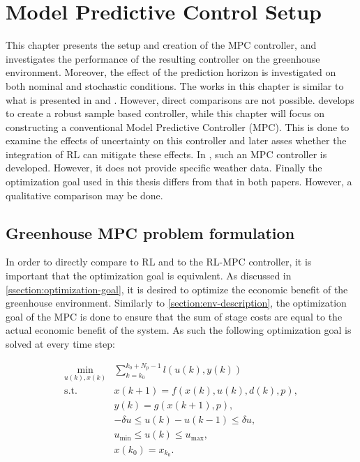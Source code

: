 \chapter{Model Predictive Control Setup}
\label{chapter:MPC}
This chapter presents the setup and creation of the MPC controller, and investigates the performance of the resulting controller on the greenhouse environment. Moreover, the effect of the prediction horizon is investigated on both nominal and stochastic conditions. The works in this chapter is similar to what is presented in \cite{boersmaRobustSamplebasedModel2022} and \cite{morcegoReinforcementLearningModel2023}. However, direct comparisons are not possible. \cite{boersmaRobustSamplebasedModel2022} develops to create a robust sample based controller, while this chapter will focus on constructing a conventional Model Predictive Controller (MPC). This is done to examine the effects of uncertainty on this controller and later asses whether the integration of RL can mitigate these effects. In \cite{morcegoReinforcementLearningModel2023}, such an MPC controller is developed. However, it does not provide specific weather data. Finally the optimization goal used in this thesis differs from that in both papers. However, a qualitative comparison may be done.




\section{Greenhouse MPC problem formulation}\label{section: greenhouse MPC formulation}
In order to directly compare to RL and to the RL-MPC controller, it is important that the optimization goal is equivalent. As discussed in \autoref{ssection:optimization-goal}, it is desired to optimize the economic benefit of the greenhouse environment. Similarly to \autoref{section:env-description}, the optimization goal of the MPC is done to ensure that the sum of stage costs are equal to the actual economic benefit of the system. As such the following optimization goal is solved at every time step:

\begin{subequations} \label{eq:mpc_ocp}
	\begin{align}
		\min_{u(k),x(k)} & \sum_{k = k_0}^{k_0 + N_p-1} {l(u(k), y(k))} \\
		\text{s.t.} \quad & x(k+1) = f(x(k), u(k), d(k), p),  \label{eq:constraint-1} \\
		& y(k) = g(x(k+1), p), \label{eq:constraint-dynamics} \\
		& -\delta u \leq u(k) - u(k-1) \leq \delta u, \label{eq:constraint-delta-u} \\
		& u_{\min} \leq u(k) \leq u_{\max}, \label{eq:constraint-u-limits}\\
		& x(k_0) = x_{k_0}. \label{eq:constraint-initial}
	\end{align}
\end{subequations}


